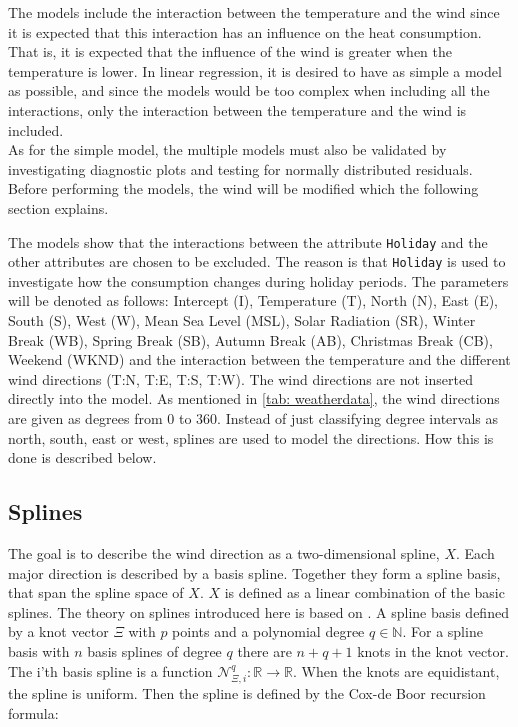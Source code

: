 The models include the interaction between the temperature and the wind since it is expected that this interaction has an influence on the heat consumption. That is, it is expected that the influence of the wind is greater when the temperature is lower. In linear regression, it is desired to have as simple a model as possible, and since the models would be too complex when including all the interactions, only the interaction between the temperature and the wind is included.\\

\noindent As for the simple model, the multiple models must also be validated by investigating diagnostic plots and testing for normally distributed residuals. Before performing the models, the wind will be modified which the following section explains.

\noindent The models show that the interactions between the attribute \texttt{Holiday} and the other attributes are chosen to be excluded. The reason is that \texttt{Holiday} is used to investigate how the consumption changes during holiday periods. The parameters will be denoted as follows: Intercept (I), Temperature (T), North (N), East (E), South (S), West (W), Mean Sea Level (MSL), Solar Radiation (SR), Winter Break (WB), Spring Break (SB), Autumn Break (AB), Christmas Break (CB), Weekend (WKND) and the interaction between the temperature and the different wind directions (T:N, T:E, T:S, T:W). The wind directions are not inserted directly into the model. As mentioned in \cref{tab: weatherdata}, the wind directions are given as degrees from $0$ to $360$. Instead of just classifying degree intervals as north, south, east or west, splines are used to model the directions. How this is done is described below.

\subsection{Splines}
The goal is to describe the wind direction as a two-dimensional spline, $X$. Each major direction is described by a basis spline. Together they form a spline basis, that span the spline space of $X$. $X$ is defined as a linear combination of the basic splines. The theory on splines introduced here is based on \cite{Splines}. A spline basis defined by a knot vector $\Xi$ with $p$ points and a polynomial degree $q\in \mathbb{N}$. For a spline basis with $n$ basis splines of degree $q$ there are $n+q+1$ knots in the knot vector. The i'th basis spline is a function $\mathcal{N}^q_{\Xi,i}: \mathbb{R} \rightarrow \mathbb{R}$. When the knots are equidistant, the spline is uniform. Then the spline is defined by the Cox-de Boor recursion formula:

